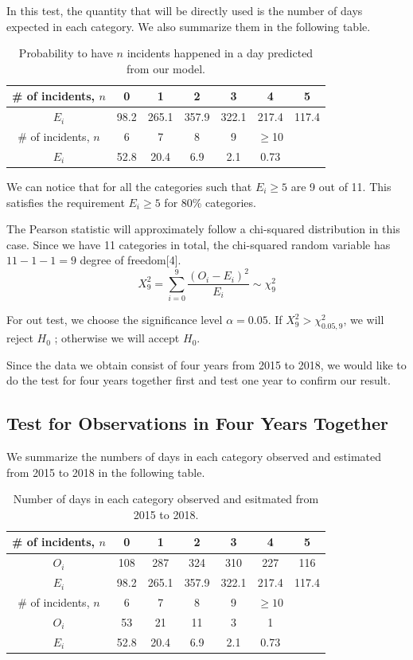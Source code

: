 \documentclass[11pt,a4paper,english]{article}
\begin{document}
In this test, the quantity that will be directly used is the number of days expected in each category. We also summarize them in the following table.

\begin{table}[htbp]
    \centering
    \caption{Probability to have $n$ incidents happened in a day predicted from our model.}
	\begin{tabular}{c|cccccc}
		\hline
		\# of incidents, $n$ & 0 & 1 & 2 & 3 & 4 & 5\\
		\hline
		$E_{i}$ & 98.2 & 265.1 & 357.9 & 322.1 & 217.4 & 117.4\\ 
		\hline
		\# of incidents, $n$  & 6 & 7 & 8 & 9 & $\geq$10 & \\
		\hline
		$E_{i}$  & 52.8 & 20.4 & 6.9 & 2.1 & 0.73 & \\ 
		\hline
    \end{tabular}
\end{table}

We can notice that for all the categories such that $E_{i} \geq 5$ are 9 out of 11. This satisfies the requirement $E_{i} \geq 5$ for 80\% categories.

The Pearson statistic will approximately follow a chi-squared distribution in this case. Since we have 11 categories in total, the chi-squared random variable has $11-1-1 = 9$ degree of freedom[4].
\[X^{2}_{9} = \sum_{i = 0}^{9}
\frac{(O_{i}-E_{i})^{2}}{E_{i}} \sim \chi_{9}^{2}\]

For out test, we choose the significance level $\alpha = 0.05$. If $X^{2}_{9} > \chi_{0.05,9}^{2}$, we will reject $H_{0}$ ; otherwise we will accept $H_{0}$.

Since the data we obtain consist of four years from 2015 to 2018, we would like to do the test for four years together first and test one year to confirm our result. 
\subsection{Test for Observations in Four Years Together}
We summarize the numbers of days in each category observed and estimated from 2015 to 2018 in the following table.
\begin{table}[htbp]
    \centering
    \caption{Number of days in each category observed and esitmated from 2015 to 2018.}
	\begin{tabular}{c|cccccc}
		\hline
        \# of incidents, $n$ & 0 & 1 & 2 & 3 & 4 & 5 \\
		\hline
		$O_{i}$ & 108 & 287 & 324 & 310 & 227 & 116\\
		\hline
		$E_{i}$ & 98.2 & 265.1 & 357.9 & 322.1 & 217.4 & 117.4\\ 
		\hline
		\hline
		\# of incidents, $n$ & 6 & 7 & 8 & 9 & $\geq 10$ & \\
		\hline
		$O_{i}$ & 53 & 21 & 11 & 3 & 1 &\\
		\hline
		$E_{i}$  & 52.8 & 20.4 & 6.9 & 2.1 & 0.73 & \\ 
		\hline 
    \end{tabular}
\end{table}
\end{document}

